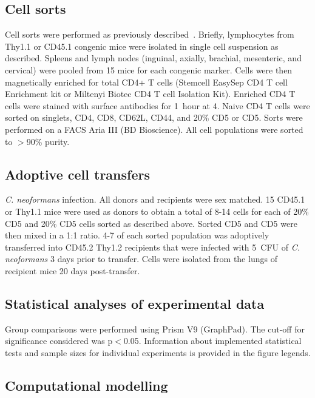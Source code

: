 \subsection{Cell sorts}

Cell sorts were performed as previously described~\cite{rogers2021pre}. Briefly, lymphocytes from Thy1.1\pos{} or CD45.1\pos{} congenic mice were isolated in single cell suspension as described. Spleens and lymph nodes (inguinal, axially, brachial, mesenteric, and cervical) were pooled from 15 mice for each congenic marker. Cells were then magnetically enriched for total CD4+ T cells (Stemcell EasySep CD4\pos{} T cell Enrichment kit or Miltenyi Biotec CD4\pos{} T cell Isolation Kit). Enriched CD4\pos{} T cells were stained with surface antibodies for 1~hour at 4. Naive CD4\pos{} T cells were sorted on singlets, CD4\pos{}, CD8\neg{}, CD62L, CD44, and 20\% CD5 or CD5. Sorts were performed on a FACS Aria III (BD Bioscience). All cell populations were sorted to $>$90\% purity.

\subsection{Adoptive cell transfers}

\textit{C. neoformans} infection. All donors and recipients were sex matched. 15 CD45.1\pos{} or Thy1.1\pos{} mice were used as donors to obtain a total of 8-14 cells for each of 20\% CD5 and 20\% CD5 cells sorted as described above. Sorted CD5 and CD5 were then mixed in a 1:1 ratio. 4-7 of each sorted population was adoptively transferred into CD45.2\pos{} Thy1.2\pos{} recipients that were infected with 5~CFU of \textit{C. neoformans} 3 days prior to transfer. Cells were isolated from the lungs of recipient mice 20 days post-transfer.

\subsection{Statistical analyses of experimental data}

Group comparisons were performed using Prism V9 (GraphPad). The cut-off for significance considered was p$<$0.05. Information about implemented statistical tests and sample sizes for individual experiments is provided in the figure legends.

\subsection{Computational modelling}

